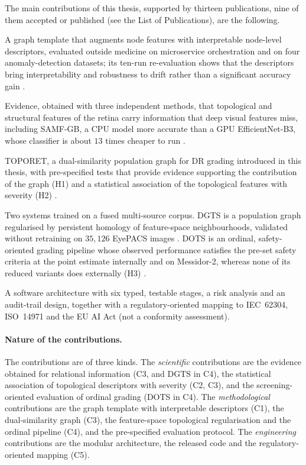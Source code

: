 The main contributions of this thesis, supported by thirteen publications, nine of them
accepted or published (see the List of
Publications), are the following.
\begin{description}[leftmargin=2.2em,style=sameline,itemsep=3pt]
\item[C1.] A graph template that augments node features with interpretable node-level
descriptors, evaluated outside medicine on microservice orchestration and on four
anomaly-detection datasets; its ten-run re-evaluation shows that the descriptors bring
interpretability and robustness to drift rather than a significant accuracy gain
\cite{belhadj2025icaart,belhadj2026invariants,belhadj2026lnaiinv,belhadj2025ijcnn}.
\item[C2.] Evidence, obtained with three independent methods, that topological and
structural features of the retina carry information that deep visual features miss,
including SAMF-GB, a CPU model more accurate than a GPU EfficientNet-B3, whose
classifier is about $13$ times cheaper to run \cite{belhadj2026hybrid,mezghich2026lnaitopo,belhadj2026icpram,belhadj2026samfgb}.
\item[C3.] TOPORET, a dual-similarity population graph for DR grading
introduced in this thesis, with pre-specified tests that provide evidence supporting the contribution of the
graph (H1) and a statistical association of the topological features with severity (H2) \cite{belhadj2025plos,belhadj2026enase,belhadj2026miua}.
\item[C4.] Two systems trained on a fused multi-source corpus. DGTS is a population graph
regularised by persistent homology of feature-space neighbourhoods, validated without
retraining on $35{,}126$ EyePACS images \cite{belhadj2026dgts}. DOTS is an ordinal,
safety-oriented grading pipeline whose observed performance satisfies the pre-set
safety criteria at the point estimate internally and on Messidor-2, whereas none of its reduced variants does
externally (H3) \cite{belhadj2026dots}.
\item[C5.] A software architecture with six typed, testable stages, a risk analysis and an
audit-trail design, together with a regulatory-oriented mapping to IEC~62304, ISO~14971 and
the EU AI Act (not a conformity assessment).
\end{description}

\paragraph{Nature of the contributions.}
The contributions are of three kinds. The \emph{scientific} contributions are the
evidence obtained for relational information (C3, and DGTS in C4), the statistical
association of topological descriptors with severity (C2, C3), and the screening-oriented
evaluation of ordinal grading (DOTS in C4). The \emph{methodological} contributions are the
graph template with interpretable descriptors (C1), the dual-similarity graph (C3), the
feature-space topological regularisation and the ordinal pipeline (C4), and the
pre-specified evaluation protocol. The \emph{engineering} contributions are the modular
architecture, the released code and the regulatory-oriented mapping (C5).

